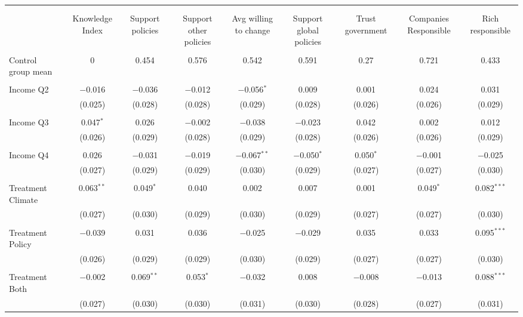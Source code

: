 
\begin{tabular}{@{\extracolsep{5pt}}lcccccccc} 
\\[-1.8ex]\hline 
\hline \\[-1.8ex] 
\\[-1.8ex] & Knowledge Index & Support policies & Support other policies & Avg willing to change & Support global policies & Trust government & Companies Responsible & Rich responsible \\ 
\hline \\[-1.8ex] 
 Control group mean & 0 & 0.454 & 0.576 & 0.542 & 0.591 & 0.27 & 0.721 & 0.433  \\ \hline \\[-1.8ex] Income Q2 & $-$0.016 & $-$0.036 & $-$0.012 & $-$0.056$^{*}$ & 0.009 & 0.001 & 0.024 & 0.031 \\ 
  & (0.025) & (0.028) & (0.028) & (0.029) & (0.028) & (0.026) & (0.026) & (0.029) \\ 
  & & & & & & & & \\ 
 Income Q3 & 0.047$^{*}$ & 0.026 & $-$0.002 & $-$0.038 & $-$0.023 & 0.042 & 0.002 & 0.012 \\ 
  & (0.026) & (0.029) & (0.028) & (0.029) & (0.028) & (0.026) & (0.026) & (0.029) \\ 
  & & & & & & & & \\ 
 Income Q4 & 0.026 & $-$0.031 & $-$0.019 & $-$0.067$^{**}$ & $-$0.050$^{*}$ & 0.050$^{*}$ & $-$0.001 & $-$0.025 \\ 
  & (0.027) & (0.029) & (0.029) & (0.030) & (0.029) & (0.027) & (0.027) & (0.030) \\ 
  & & & & & & & & \\ 
 Treatment Climate & 0.063$^{**}$ & 0.049$^{*}$ & 0.040 & 0.002 & 0.007 & 0.001 & 0.049$^{*}$ & 0.082$^{***}$ \\ 
  & (0.027) & (0.030) & (0.029) & (0.030) & (0.029) & (0.027) & (0.027) & (0.030) \\ 
  & & & & & & & & \\ 
 Treatment Policy & $-$0.039 & 0.031 & 0.036 & $-$0.025 & $-$0.029 & 0.035 & 0.033 & 0.095$^{***}$ \\ 
  & (0.026) & (0.029) & (0.029) & (0.030) & (0.029) & (0.027) & (0.027) & (0.030) \\ 
  & & & & & & & & \\ 
 Treatment Both & $-$0.002 & 0.069$^{**}$ & 0.053$^{*}$ & $-$0.032 & 0.008 & $-$0.008 & $-$0.013 & 0.088$^{***}$ \\ 
  & (0.027) & (0.030) & (0.030) & (0.031) & (0.030) & (0.028) & (0.027) & (0.031) \\ 

\end{tabular}
